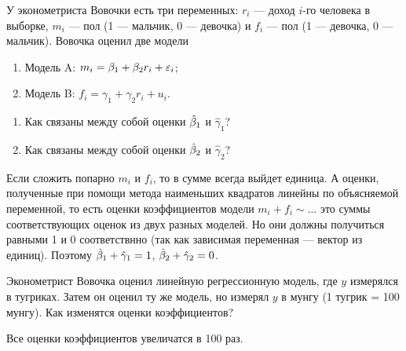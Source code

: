 \begin{problem} %
У эконометриста Вовочки есть три переменных: $r_i$ — доход $i$-го человека в выборке, $m_i$ — пол (1 — мальчик, 0 — девочка) и $f_i$ — пол (1 — девочка, 0 — мальчик). Вовочка оценил две модели
\begin{enumerate}
\item[] Модель A: $m_i=\beta_1+\beta_2 r_i+\varepsilon_i$;
\item[] Модель B: $f_i=\gamma_1+\gamma_2 r_i+u_i$.
\end{enumerate}
\begin{enumerate}
\item Как связаны между собой оценки $\hat{\beta}_1$ и $\hat{\gamma}_1$?
\item Как связаны между собой оценки $\hat{\beta}_2$ и $\hat{\gamma}_2$?
\end{enumerate}


\begin{sol}
Если сложить попарно $m_i$ и $f_i$, то в сумме всегда выйдет единица. А оценки, полученные при помощи метода наименьших квадратов линейны по объясняемой переменной, то есть оценки коэффициентов модели $m_i+f_i \sim \dots$ это суммы соответствующих оценок из двух разных моделей. Но они должны получиться равными 1 и 0 соответствнно (так как зависимая переменная — вектор из единиц). Поэтому $\hat{\beta}_1 + \hat{\gamma}_1 = 1$, $\hat{\beta}_2 + \hat{\gamma}_2 = 0$.
\end{sol}
\end{problem}




\begin{problem} %
Эконометрист Вовочка оценил линейную регрессионную модель, где $y$ измерялся в тугриках. Затем он оценил ту же модель, но измерял $y$ в мунгу (1 тугрик = 100 мунгу). Как изменятся оценки коэффициентов?


\begin{sol}
Все оценки коэффициентов увеличатся в 100 раз.
\end{sol}
\end{problem}



